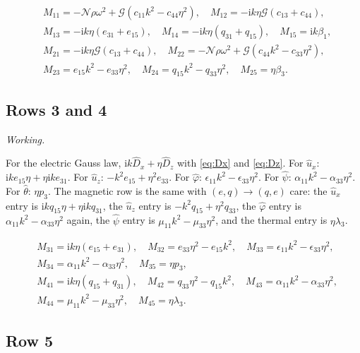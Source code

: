 \documentclass[11pt,a4paper]{article}
\newif\ifshowworked \showworkedtrue
\newenvironment{worked}{\ifshowworked\par\smallskip\noindent\textit{Working.}\par\else\setbox0\vbox\bgroup\fi}{\ifshowworked\par\smallskip\else\egroup\fi}
\newcommand{\Nc}{\mathcal{N}}
\newcommand{\Gc}{\mathcal{G}}
\newcommand{\ii}{\mathrm{i}}
\newcommand{\bx}{\hat u_x}
\newcommand{\bz}{\hat u_z}
\newcommand{\bp}{\hat\varphi}
\newcommand{\bpsi}{\hat\psi}
\newcommand{\bt}{\hat\theta}
\newcommand{\aME}{\alpha}
\begin{document}
\noindent
\begin{equation}\label{eq:row12}
\begin{aligned}
&M_{11}=-\Nc\rho\omega^2+\Gc(c_{11}k^2-c_{44}\eta^2),\quad
M_{12}=-\ii k\eta\Gc(c_{13}+c_{44}),\\
&M_{13}=-\ii k\eta(e_{31}+e_{15}),\quad
M_{14}=-\ii k\eta(q_{31}+q_{15}),\quad M_{15}=\ii k\beta_1,\\
&M_{21}=-\ii k\eta\Gc(c_{13}+c_{44}),\quad
M_{22}=-\Nc\rho\omega^2+\Gc(c_{44}k^2-c_{33}\eta^2),\\
&M_{23}=e_{15}k^2-e_{33}\eta^2,\quad
M_{24}=q_{15}k^2-q_{33}\eta^2,\quad M_{25}=\eta\beta_3 .
\end{aligned}
\end{equation}

\subsection{Rows 3 and 4}

\begin{worked}
For the electric Gauss law, $\ii k\hat D_x+\eta\hat D_z$ with \eqref{eq:Dx} and \eqref{eq:Dz}. For $\bx$:
$\ii ke_{15}\eta+\eta\ii ke_{31}$. For $\bz$: $-k^2e_{15}+\eta^2e_{33}$. For $\bp$:
$\epsilon_{11}k^2-\epsilon_{33}\eta^2$. For $\bpsi$: $\aME_{11}k^2-\aME_{33}\eta^2$. For $\bt$: $\eta p_3$.
The magnetic row is the same with $(e,q)\to(q,e)$ care: the $\bx$ entry is $\ii kq_{15}\eta+\eta\ii kq_{31}$,
the $\bz$ entry is $-k^2q_{15}+\eta^2q_{33}$, the $\bp$ entry is $\aME_{11}k^2-\aME_{33}\eta^2$ again, the
$\bpsi$ entry is $\mu_{11}k^2-\mu_{33}\eta^2$, and the thermal entry is $\eta\lambda_3$.
\end{worked}

\noindent
\begin{equation}\label{eq:row34}
\begin{aligned}
&M_{31}=\ii k\eta(e_{15}+e_{31}),\quad M_{32}=e_{33}\eta^2-e_{15}k^2,\quad
M_{33}=\epsilon_{11}k^2-\epsilon_{33}\eta^2,\\
&M_{34}=\aME_{11}k^2-\aME_{33}\eta^2,\quad M_{35}=\eta p_3,\\
&M_{41}=\ii k\eta(q_{15}+q_{31}),\quad M_{42}=q_{33}\eta^2-q_{15}k^2,\quad
M_{43}=\aME_{11}k^2-\aME_{33}\eta^2,\\
&M_{44}=\mu_{11}k^2-\mu_{33}\eta^2,\quad M_{45}=\eta\lambda_3 .
\end{aligned}
\end{equation}

\subsection{Row 5}
\end{document}
